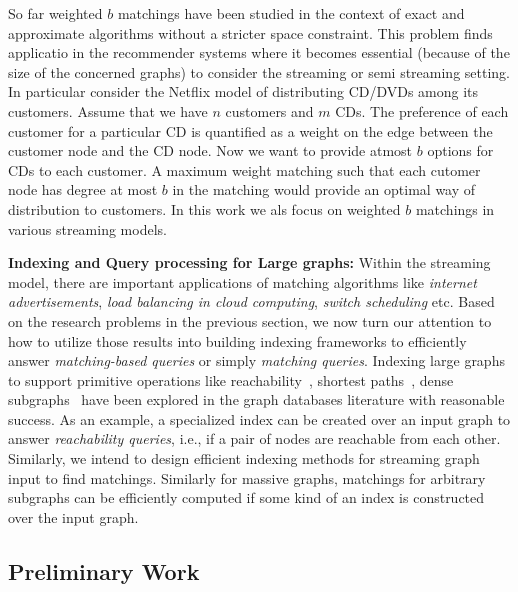 So far weighted $b$ matchings have been studied in the context of exact and approximate algorithms without a stricter space constraint. This problem finds applicatio in the recommender systems where it becomes essential (because of the size of the concerned graphs) to consider the streaming or semi streaming setting. In particular consider the Netflix model of distributing CD/DVDs among its customers. Assume that we have $n$ customers and $m$ CDs. The preference of each customer for a particular CD is quantified as a weight on the edge between the customer node and the CD node. Now we want to provide atmost $b$ options for CDs to each customer. A maximum weight matching such that each cutomer node has degree at most $b$ in the matching would provide an optimal way of distribution to customers. In this work we als focus on weighted $b$ matchings in various streaming models.

\textbf{Indexing and Query processing for Large graphs:} Within the streaming model, there are important applications of matching algorithms like \emph{internet advertisements}, \emph{load balancing in cloud computing}, \emph{switch scheduling} etc. Based on the research problems in the previous section, we now turn our attention to how to utilize those results into building indexing frameworks to efficiently answer \emph{matching-based queries} or simply \emph{matching queries}. Indexing large graphs to support primitive operations like reachability~\cite{seufert2013ferrari}, shortest paths~\cite{Gubichev:2010}, dense subgraphs~\cite{angel_dense_2013} have been explored in the graph databases literature with reasonable success.  As an example, a specialized index can be created over an input graph to answer \emph{reachability queries}, i.e., if a pair of nodes are reachable from each other. Similarly, we intend to design efficient indexing methods for streaming graph input to find matchings. Similarly for massive graphs, matchings for arbitrary subgraphs can be efficiently computed if some kind of an index is constructed over the input graph.

\subsection{Preliminary Work}


